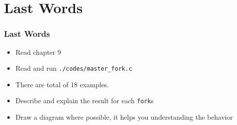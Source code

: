\documentclass[newPxFont,sthlmFooter,nooffset]{beamer}
\begin{document}
\section{Last Words}

\begin{frame}[t]
  \frametitle{Last Words}
\begin{itemize}
\item Read chapter 9
\item Read and run \texttt{./codes/master\_fork.c}
\item There are total of 18 examples.
\item Describe and explain the result for each \texttt{fork}s
\item Draw a diagram where possible, it helps you understanding the behavior
\end{itemize}
\end{frame}
\end{document}

